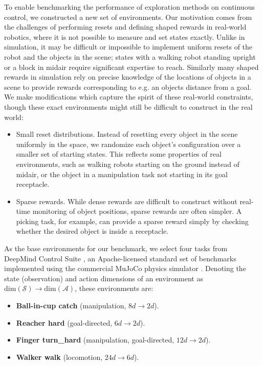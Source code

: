 To enable benchmarking the performance of exploration methods on continuous control, we constructed a new set of environments.
Our motivation comes from the challenges of performing resets and defining shaped rewards in real-world robotics, where it is not possible to measure and set states exactly.
Unlike in simulation, it may be difficult or impossible to implement uniform resets of the robot and the objects in the scene; states with a walking robot standing upright or a block in midair require significant expertise to reach.
Similarly many shaped rewards in simulation rely on precise knowledge of the locations of objects in a scene to provide rewards corresponding to e.g. an objects distance from a goal.
We make modifications which capture the spirit of these real-world constraints, though these exact environments might still be difficult to construct in the real world:
\begin{itemize}
    \item Small reset distributions.
    Instead of resetting every object in the scene uniformly in the space, we randomize each object's configuration over a smaller set of starting states.
    This reflects some properties of real environments, such as walking robots starting on the ground instead of midair, or the object in a manipulation task not starting in its goal receptacle.
    \item Sparse rewards.
    While dense rewards are difficult to construct without real-time monitoring of object positions, sparse rewards are often simpler.
    A picking task, for example, can provide a sparse reward simply by checking whether the desired object is inside a receptacle.
\end{itemize}

As the base environments for our benchmark, we select four tasks from DeepMind Control Suite \citep{tassa2018deepmind}, an Apache-licensed standard set of benchmarks implemented using the commercial MuJoCo physics simulator \citep{todorov2012mujoco}.
Denoting the state (observation) and action dimensions of an environment as $\text{dim}(\mathcal{S}) \rightarrow \text{dim}(\mathcal{A})$, these environments are:
\begin{itemize}
    \item \textbf{Ball-in-cup catch} (manipulation, $8d \rightarrow 2d$).
    \item \textbf{Reacher hard} (goal-directed, $6d \rightarrow 2d$).
    \item \textbf{Finger turn\_hard} (manipulation, goal-directed, $12d \rightarrow 2d$).
    \item \textbf{Walker walk} (locomotion, $24d \rightarrow 6d$).
\end{itemize}

